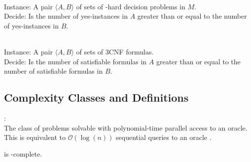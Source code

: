 \begin{problem}{} \\
    \tab Instance: A pair $\langle A,B \rangle$ of sets of \np-hard decision problems
    in $M$.\\
    \tab Decide: Is the number of yes-instances in $A$
    greater than or equal to the number of yes-instances in $B$.
\end{problem}

\begin{problem}{\csat} \citep{compsat}\\
    \tab Instance: A pair $\langle A,B \rangle$ of sets of 3CNF formulas.\\
    \tab Decide: Is the number of satisfiable formulas in $A$
    greater than or equal to the number of satisfiable formulas in $B$.
\end{problem}

\subsection{Complexity Classes and Definitions}

\begin{defn}{\tp:} \\
    The class of problems solvable with polynomial-time parallel access to an
    \np oracle.
    This is equivalent to $\mathcal{O}(\log(n))$ sequential queries to an \np
    oracle \citep{hem87, ksw87}.
\end{defn}

\begin{theorem}\label{thm:csat} \citep{compsat}
    \csat is \tp-complete.
\end{theorem}



